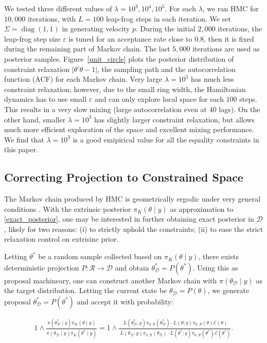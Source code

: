 \documentclass[10pt]{article}
\newcommand{\mc}[1]{\mathcal{#1}}
\DeclareMathOperator{\diag}{diag}
\DeclareMathOperator{\1}{\mathbbm{1}}
\begin{document}
We tested three different values of $\lambda = 10^3,10^4,10^5$. For each $\lambda$, we ran HMC for $10,000$ iterations, with $L=100$ leap-frog steps in each iteration. 
We set $\Sigma= \diag(1,1)$ in generating velocity $p$. During the initial $2,000$ iterations, the leap-frog step size $\varepsilon$ is tuned for an acceptance rate close to $0.8$, then it is fixed during the remaining part of Markov chain. The last $5,000$ iterations are used as posterior samples. Figure~\ref{unit_circle} plots the posterior distribution of constraint relaxation $|\theta'\theta -1|$, the sampling path and the autocorrelation function (ACF) for each Markov chain. Very large $\lambda=10^5$ has much less constraint relaxation; however, due to the small ring width, the Hamiltonian dynamics has to use small $\varepsilon$ and can only explore local space for each $100$ steps. This results in a very slow mixing (large autocorrelation even at 40 lags). On the other hand, smaller $\lambda=10^3$ has slightly larger constraint relaxation, but allows much more efficient exploration of the space and excellent mixing performance. We find that $\lambda=10^3$ is a good emipirical value for all the equality constraints in this paper.


\subsection{Correcting Projection to Constrained Space}
 
The Markov chain produced by HMC is geometrically ergodic under very general conditions \citep{livingstone2016geometric}. With the extrinsic posterior $\pi_K(\theta \mid y)$ as approximation to \eqref{exact_posterior}, one may be interested in further obtaining exact posterior in $\mc D$, likely for two reasons:  (i) to strictly uphold the constraints; (ii) to ease the strict relaxation control on extrisinc prior.

Letting $\theta^*$ be a random sample collected based on $\pi_K(\theta \mid y)$, there exists deterministic projection $P: \mc R\rightarrow \mc D$ and obtain $\theta^*_{\mc D}= P(\theta^*)$. Using this as proposal machineary, one can construct another Markov chain with $\pi(\theta_{\mc D}  \mid y)$ as the target distribution. Letting the current state be $\theta_{\mc D} = P(\theta)$, we generate proposal $\theta^*_{\mc D}= P(\theta^*)$ and accept it with probability:

\begin{equation}
 \begin{aligned}
 1 \wedge \frac{\pi(\theta^*_{\mc D} \mid y) \pi_K(\theta  \mid y) }{\pi(\theta_{\mc D}  \mid y)\pi_K(\theta^* \mid y)} =  1 \wedge \frac{\ L(\theta^*_{\mc D};y)\pi_{0,\mc R}(\theta^*_{\mc D})  \cdot    L(\theta;y)\pi_{0,\mc R}(\theta)   \mc E(\theta)}{\ L(\theta_{\mc D};y)\pi_{0,\mc R}(\theta_{\mc D})   \cdot L(\theta^*;y)\pi_{0,\mc R}(\theta^*)   \mc E(\theta^{*})}.
 \end{aligned}
 \end{equation}
 
\end{document}
